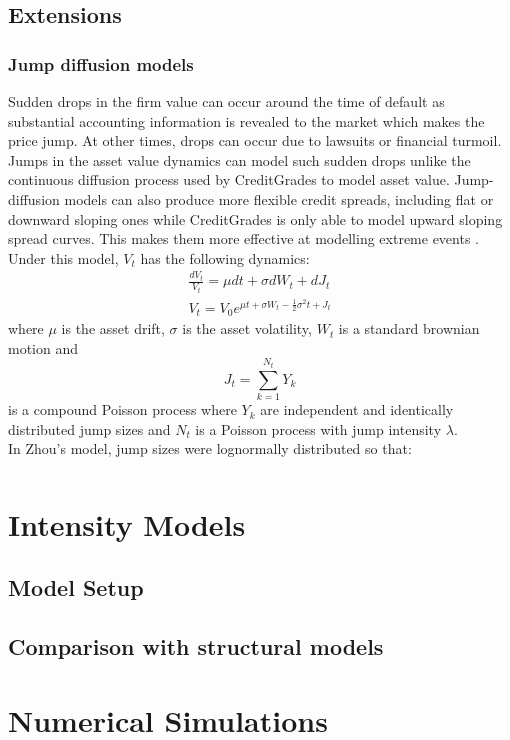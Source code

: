 \documentclass[11t,a4paper]{article}
\begin{document}
\subsection{Extensions}
\subsubsection{Jump diffusion models}
Sudden drops in the firm value can occur around the time of default as substantial accounting information is revealed to the market which makes the price jump. At other times, drops can occur due to lawsuits or financial turmoil. Jumps in the asset value dynamics can model such sudden drops unlike the continuous diffusion process used by CreditGrades to model asset value. Jump-diffusion models can also produce more flexible credit spreads, including flat or downward sloping ones while CreditGrades is only able to model upward sloping spread curves. This makes them more effective at modelling extreme events \cite{zhou}. 
Under this model, $V_t$ has the following dynamics:
\begin{gather}
    \frac{dV_t}{V_t} = \mu dt + \sigma dW_t + dJ_t \\
    V_t = V_0 e^{\mu t + \sigma W_t - \frac{1}{2}\sigma^2t + J_t} 
\end{gather}
where $\mu$ is the asset drift, $\sigma$ is the asset volatility, $W_t$ is a standard brownian motion and \[J_t = \sum_{k=1}^{N_t}Y_k\]
is a compound Poisson process where $Y_k$ are independent and identically distributed jump sizes and $N_t$ is a Poisson process with jump intensity $\lambda$. \\
In Zhou's model, jump sizes were lognormally distributed so that:
\begin{align}

\end{align}

\section{Intensity Models}

\subsection{Model Setup}
\subsection{Comparison with structural models}
\section{Numerical Simulations}
\end{document}
